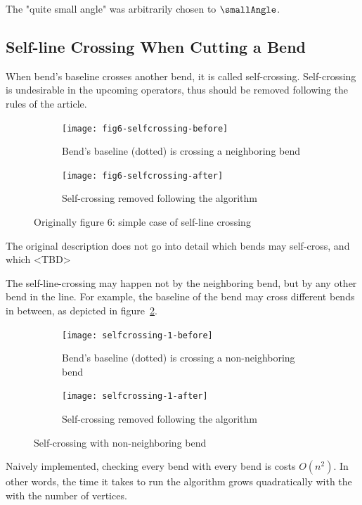\documentclass[a4paper]{article}
\begin{document}
The "quite small angle" was arbitrarily chosen to $\smallAngle$.

\subsection{Self-line Crossing When Cutting a Bend}

When bend's baseline crosses another bend, it is called self-crossing.
Self-crossing is undesirable in the upcoming operators, thus should be removed
following the rules of the article.

\begin{figure}[h]
    \centering
    \begin{subfigure}[b]{.49\textwidth}
        \texttt{[image: fig6-selfcrossing-before]}
        \caption{Bend's baseline (dotted) is crossing a neighboring bend}
    \end{subfigure}
    \hfill
    \begin{subfigure}[b]{.49\textwidth}
        \texttt{[image: fig6-selfcrossing-after]}
        \caption{Self-crossing removed following the algorithm}
    \end{subfigure}
    \caption{Originally figure 6: simple case of self-line crossing}
    \label{fig:fig6-selfcrossing}
\end{figure}

The original description does not go into detail which bends may self-cross, and which <TBD>

The self-line-crossing may happen not by the neighboring bend, but by any other
bend in the line. For example, the baseline of the bend may cross different
bends in between, as depicted in figure~\ref{fig:selfcrossing-1-non-neighbor}.

\begin{figure}[h]
    \centering
    \begin{subfigure}[b]{.49\textwidth}
        \texttt{[image: selfcrossing-1-before]}
        \caption{Bend's baseline (dotted) is crossing a non-neighboring bend}
    \end{subfigure}
    \hfill
    \begin{subfigure}[b]{.49\textwidth}
        \texttt{[image: selfcrossing-1-after]}
        \caption{Self-crossing removed following the algorithm}
    \end{subfigure}
    \caption{Self-crossing with non-neighboring bend}
    \label{fig:selfcrossing-1-non-neighbor}
\end{figure}

Naively implemented, checking every bend with every bend is costs $O(n^2)$. In
other words, the time it takes to run the algorithm grows quadratically with
the with the number of vertices.
\end{document}
